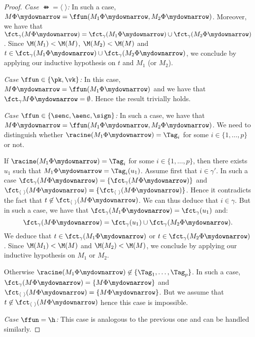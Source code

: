 \begin{proof}
 \smallskip{}

 \emph{Case $\ffun = \langle\;\rangle$:} In such a case, $M\Phi\mydownarrow =
 \ffun(M_1\Phi\mydownarrow, M_2\Phi\mydownarrow)$. Moreover, we have
 that 
$\fct_\gamma(M\Phi\mydownarrow) = \fct_\gamma(M_1\Phi\mydownarrow) \cup
 \fct_\gamma(M_2\Phi\mydownarrow)$. Since $\M(M_1) < \M(M)$, $\M(M_2) < \M(M)$ and
 $t \in \fct_\gamma(M_1\Phi\mydownarrow) \cup \fct_\gamma(M_2\Phi\mydownarrow)$, we
 conclude by applying our inductive hypothesis on $t$ and $M_1$ (or $M_2$).

\smallskip{}

 \emph{Case $\ffun \in \{\pk, \vk\}$:} In this case, $M\Phi\mydownarrow =
 \ffun(M_1\Phi\mydownarrow)$ and we have
 that $\fct_\gamma{M\Phi\mydownarrow} = \emptyset$. Hence the result trivially holds.

\smallskip{}
 
 \emph{Case $\ffun \in \{\senc, \aenc, \sign\}$:} In such a case, we
 have that
 $M\Phi\mydownarrow = \ffun(M_1\Phi\mydownarrow, M_2\Phi\mydownarrow)$. We need
 to distinguish whether $\racine(M_1\Phi\mydownarrow) = \Tag_i$ for
 some $i \in \{1,\ldots,p\}$ or not.

 If $\racine(M_1\Phi\mydownarrow) = \Tag_i$ for some $i \in
 \{1,\ldots, p\}$,  then there exists $u_1$ such that $M_1\Phi\mydownarrow =
 \Tag_i(u_1)$. Assume first that $i \in \gamma'$. In such a case $\fct_\gamma(M\Phi\mydownarrow) = \{ \fct_\gamma(M\Phi\mydownarrow) \}$ and $\fctpair(M\Phi\mydownarrow) = \{ \fctpair(M\Phi\mydownarrow) \}$. Hence it contradicts the fact that $t \not\in \fctpair(M\Phi\mydownarrow)$. We can thus deduce that $i \in \gamma$. But in such a case, we have that $\fct_\gamma(M_1\Phi\mydownarrow) = \fct_\gamma(u_1)$ and:
\[
 \fct_\gamma(M\Phi\mydownarrow) = \fct_\gamma(u_1) \cup
 \fct_\gamma(M_2\Phi\mydownarrow).
\]
 We deduce that $t \in \fct_\gamma(M_1\Phi\mydownarrow)$ or $t \in
 \fct_\gamma(M_2\Phi\mydownarrow)$. Since $\M(M_1) < \M(M)$ and $\M(M_2) < \M(M)$,
 we conclude by applying our inductive hypothesis on $M_1$ or $M_2$.

 Otherwise $\racine(M_1\Phi\mydownarrow) \not\in \{\Tag_1, \ldots, \Tag_p\}$. In such a
 case, $\fct_\gamma(M\Phi\mydownarrow) = \{M\Phi\mydownarrow\}$ and $\fctpair(M\Phi\mydownarrow) = \{ M\Phi\mydownarrow\}$. But we assume that $t \not\in \fctpair(M\Phi\mydownarrow)$ hence this case is impossible.

\smallskip{}

 \emph{Case $\ffun = \h$:} This case is analogous to the previous one and can
 be handled similarly.



\end{proof}
